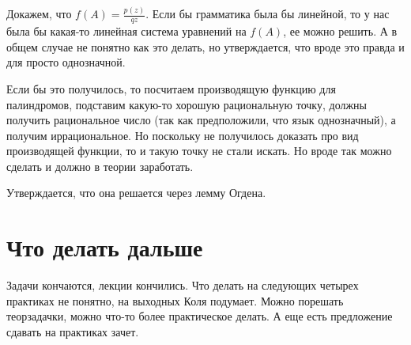 Докажем, что $f(A) = \frac{p(z)}{q{z}}$. Если бы грамматика была бы линейной, то у нас была бы какая-то линейная система уравнений на $f(A)$, ее можно решить.
А в общем случае не понятно как это делать, но утверждается, что вроде это правда и для просто однозначной.

Если бы это получилось, то посчитаем производящую функцию для палиндромов, подставим какую-то хорошую рациональную точку, 
должны получить рациональное число (так как предположили, что язык однозначный), а получим иррациональное.
Но поскольку не получилось доказать про вид производящей функции, то и такую точку не стали искать. 
Но вроде так можно сделать и должно в теории заработать.

Утверждается, что она решается через лемму Огдена.


\section{Что делать дальше}
Задачи кончаются, лекции кончились. 
Что делать на следующих четырех практиках не понятно, на выходных Коля подумает. 
Можно порешать теорзадачки, можно что-то более практическое делать.
А еще есть предложение сдавать на практиках зачет.

